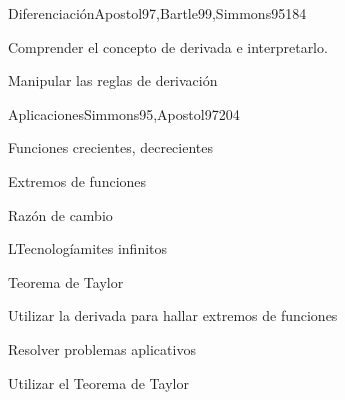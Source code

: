 \begin{syllabus}
\begin{unit}{Diferenciación}{}{Apostol97,Bartle99,Simmons95}{18}{4}
   \begin{learningoutcomes}
      \item Comprender el concepto de derivada e interpretarlo.
      \item Manipular las reglas de derivación
      \end{learningoutcomes}
\end{unit}

\begin{unit}{Aplicaciones}{}{Simmons95,Apostol97}{20}{4}
   \begin{topics}
      \item Funciones crecientes, decrecientes
      \item Extremos de funciones
      \item Razón de cambio
      \item LTecnologíamites infinitos
      \item Teorema de Taylor
   \end{topics}

   \begin{learningoutcomes}
      \item Utilizar la derivada para hallar extremos de funciones
      \item Resolver problemas aplicativos
      \item Utilizar el Teorema de Taylor
      \end{learningoutcomes}
\end{unit}

\begin{coursebibliography}
\end{coursebibliography}

\end{syllabus}
